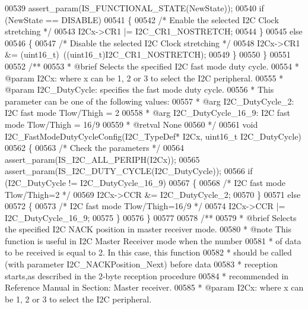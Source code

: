 \begin{DoxyCode}
00539   assert_param(IS\_FUNCTIONAL\_STATE(NewState));
00540   \textcolor{keywordflow}{if} (NewState == DISABLE)
00541   \{
00542     \textcolor{comment}{/* Enable the selected I2C Clock stretching */}
00543     I2Cx->CR1 |= I2C_CR1_NOSTRETCH;
00544   \}
00545   \textcolor{keywordflow}{else}
00546   \{
00547     \textcolor{comment}{/* Disable the selected I2C Clock stretching */}
00548     I2Cx->CR1 &= (uint16\_t)~((uint16\_t)I2C_CR1_NOSTRETCH);
00549   \}
00550 \}
00551 
00552 \textcolor{comment}{/**}
00553 \textcolor{comment}{  * @brief  Selects the specified I2C fast mode duty cycle.}
00554 \textcolor{comment}{  * @param  I2Cx: where x can be 1, 2 or 3 to select the I2C peripheral.}
00555 \textcolor{comment}{  * @param  I2C\_DutyCycle: specifies the fast mode duty cycle.}
00556 \textcolor{comment}{  *          This parameter can be one of the following values:}
00557 \textcolor{comment}{  *            @arg I2C\_DutyCycle\_2: I2C fast mode Tlow/Thigh = 2}
00558 \textcolor{comment}{  *            @arg I2C\_DutyCycle\_16\_9: I2C fast mode Tlow/Thigh = 16/9}
00559 \textcolor{comment}{  * @retval None}
00560 \textcolor{comment}{  */}
00561 \textcolor{keywordtype}{void} I2C_FastModeDutyCycleConfig(I2C\_TypeDef* I2Cx, uint16\_t I2C\_DutyCycle)
00562 \{
00563   \textcolor{comment}{/* Check the parameters */}
00564   assert_param(IS\_I2C\_ALL\_PERIPH(I2Cx));
00565   assert_param(IS\_I2C\_DUTY\_CYCLE(I2C\_DutyCycle));
00566   \textcolor{keywordflow}{if} (I2C\_DutyCycle != I2C_DutyCycle_16_9)
00567   \{
00568     \textcolor{comment}{/* I2C fast mode Tlow/Thigh=2 */}
00569     I2Cx->CCR &= I2C_DutyCycle_2;
00570   \}
00571   \textcolor{keywordflow}{else}
00572   \{
00573     \textcolor{comment}{/* I2C fast mode Tlow/Thigh=16/9 */}
00574     I2Cx->CCR |= I2C_DutyCycle_16_9;
00575   \}
00576 \}
00577 
00578 \textcolor{comment}{/**}
00579 \textcolor{comment}{  * @brief  Selects the specified I2C NACK position in master receiver mode.}
00580 \textcolor{comment}{  * @note   This function is useful in I2C Master Receiver mode when the number}
00581 \textcolor{comment}{  *         of data to be received is equal to 2. In this case, this function }
00582 \textcolor{comment}{  *         should be called (with parameter I2C\_NACKPosition\_Next) before data }
00583 \textcolor{comment}{  *         reception starts,as described in the 2-byte reception procedure }
00584 \textcolor{comment}{  *         recommended in Reference Manual in Section: Master receiver.                }
00585 \textcolor{comment}{  * @param  I2Cx: where x can be 1, 2 or 3 to select the I2C peripheral.}

\end{DoxyCode}
